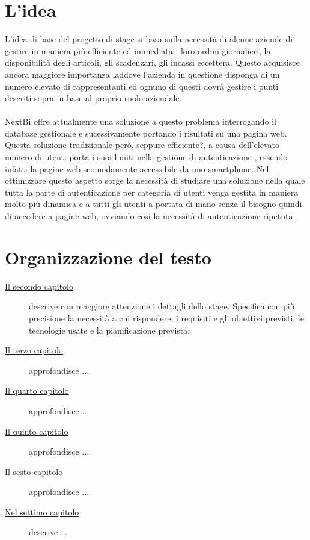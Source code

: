 \section{L'idea}

L'idea di base del progetto di stage si basa sulla necessità di alcune aziende di gestire in maniera più efficiente ed immediata i loro ordini giornalieri, la disponibilità degli articoli, gli scadenzari, gli incassi eccettera. Questo acquisisce ancora maggiore importanza laddove l'azienda in questione disponga di un numero elevato di rappresentanti ed ognuno di questi dovrà gestire i punti descriti sopra in base al proprio ruolo aziendale. \\ \\

NextBi offre attualmente una soluzione a questo problema interrogando il database  gestionale e sucessivamente portando i risultati su una pagina web. Questa soluzione tradizionale però, seppure efficiente?, a causa dell'elevato numero di utenti porta i suoi limiti nella gestione di autenticazione , essendo infatti la pagine web scomodamente accessibile da uno smartphone. Nel ottimizzare questo aspetto sorge la necessità di studiare una soluzione nella quale tutta la parte di autenticazione per categoria di utenti venga gestita in maniera molto più dinamica e a tutti gli utenti a portata di mano senza il bisogno quindi di accedere a pagine web, ovviando cosi la necessità di autenticazione ripetuta.

\section{Organizzazione del testo}

\begin{description}
    \item[{\hyperref[cap:processi-metodologie]{Il secondo capitolo}}] descrive con maggiore attenzione i dettagli dello stage. Specifica con più precisione la necessità a cui rispondere, i requisiti e gli obiettivi previsti, le tecnologie usate e la pianificazione prevista;
    
    \item[{\hyperref[cap:descrizione-stage]{Il terzo capitolo}}] approfondisce  ...
    
    \item[{\hyperref[cap:analisi-requisiti]{Il quarto capitolo}}] approfondisce ...
    
    \item[{\hyperref[cap:progettazione-codifica]{Il quinto capitolo}}] approfondisce ...
    
    \item[{\hyperref[cap:verifica-validazione]{Il sesto capitolo}}] approfondisce ...
    
    \item[{\hyperref[cap:conclusioni]{Nel settimo capitolo}}] descrive ...
\end{description}

